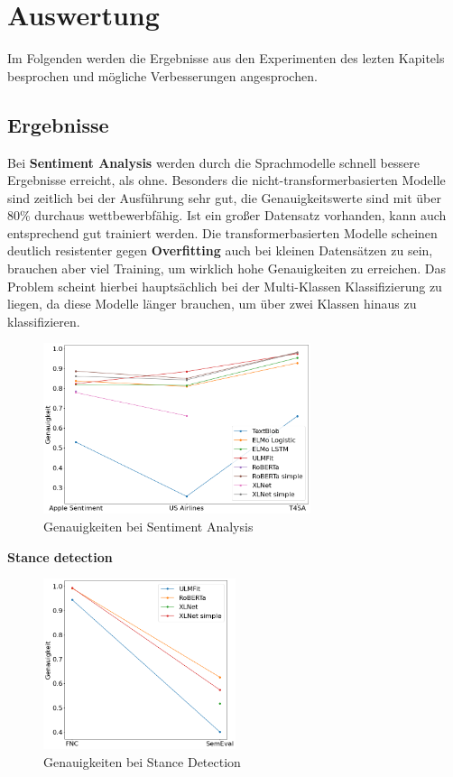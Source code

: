 \chapter{Auswertung}
Im Folgenden werden die Ergebnisse aus den Experimenten des lezten Kapitels besprochen und m\"ogliche Verbesserungen angesprochen.

\section{Ergebnisse}
Bei \textbf{Sentiment Analysis} werden durch die Sprachmodelle schnell bessere Ergebnisse erreicht, als ohne. Besonders die nicht-transformerbasierten Modelle sind zeitlich bei der Ausf\"uhrung sehr gut, die Genauigkeitswerte sind mit \"uber 80\% durchaus wettbewerbf\"ahig. Ist ein gro{\ss}er Datensatz vorhanden, kann auch entsprechend gut trainiert werden. Die transformerbasierten Modelle scheinen deutlich resistenter gegen \textbf{Overfitting} auch bei kleinen Datens\"atzen zu sein, brauchen aber viel Training, um wirklich hohe Genauigkeiten zu erreichen. Das Problem scheint hierbei haupts\"achlich bei der Multi-Klassen Klassifizierung zu liegen, da diese Modelle l\"anger brauchen, um \"uber zwei Klassen hinaus zu klassifizieren.\\
\begin{figure}[!ht]
\centering
\includegraphics[height=5cm]{pics/accuracies_sentiment.png}
\caption{Genauigkeiten bei Sentiment Analysis}
\label{fig:acc_sentiment}
\end{figure}
\textbf{Stance detection}
\begin{figure}[!ht]
\centering
\includegraphics[height=5cm]{pics/accuracies_stance.png}
\caption{Genauigkeiten bei Stance Detection}
\label{fig:acc_stance}
\end{figure}

